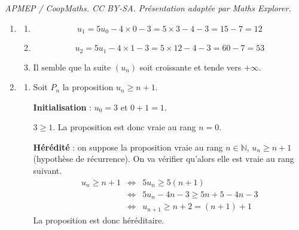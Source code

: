 \documentclass[10pt]{article}
\begin{document}
\noindent\textit{APMEP / CoopMaths. CC BY-SA. Présentation adaptée par Maths Explorer.}\par\medskip
\begin{enumerate}
	\item
	\begin{enumerate}
		\item \[u_1 = 5u_0 - 4 \times 0 - 3 = 5 \times 3 - 4 - 3 = 15 - 7 = \boxed{12}\]
		\item \[u_2 = 5u_1 - 4 \times 1 - 3 = 5 \times 12 - 4 - 3 = 60 - 7 = \boxed{53}\]
		\item Il semble que la suite $\left(u_n\right)$ soit croissante et tende vers $+\infty$.
	\end{enumerate}
	\item
	\begin{enumerate}
		\item Soit $P_n$ la proposition $u_n \geqslant n+1$.
		
\textbf{Initialisation} : $u_0 = 3$ et $0+1 = 1$.
		
$3 \geqslant 1$. La proposition est donc vraie au rang $n=0$.\\
\smallskip
		
\textbf{Hérédité} : on suppose la proposition vraie au rang $n \in \mathbb{N}$,\: $u_n \geqslant n + 1$ (hypothèse de récurrence). On va vérifier qu'alors elle est vraie au rang suivant.
\begin{eqnarray*}
u_n \geqslant n + 1 &\iff& 5u_n \geqslant 5(n+1)\\
&\iff& 5u_n - 4n - 3 \geqslant 5n + 5 - 4n - 3\\
&\iff& u_{n+1} \geqslant n + 2 = (n+1) + 1
\end{eqnarray*}
La proposition est donc héréditaire.\\
		\smallskip
		

\end{enumerate}
\end{enumerate}
\end{document}
